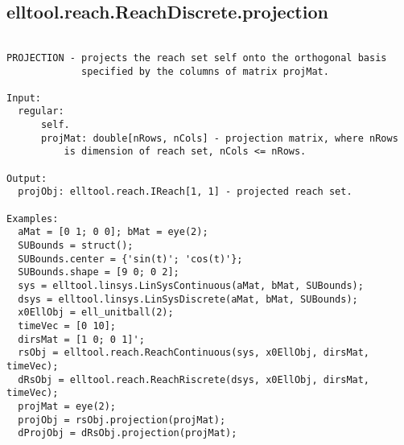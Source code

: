\subsection{\texorpdfstring{elltool.reach.ReachDiscrete.projection}{projection}}\label{method:elltool.reach.ReachDiscrete.projection}
\begin{verbatim}

PROJECTION - projects the reach set self onto the orthogonal basis
             specified by the columns of matrix projMat.

Input:
  regular:
      self.
      projMat: double[nRows, nCols] - projection matrix, where nRows
          is dimension of reach set, nCols <= nRows.

Output:
  projObj: elltool.reach.IReach[1, 1] - projected reach set.

Examples:
  aMat = [0 1; 0 0]; bMat = eye(2);
  SUBounds = struct();
  SUBounds.center = {'sin(t)'; 'cos(t)'};
  SUBounds.shape = [9 0; 0 2];
  sys = elltool.linsys.LinSysContinuous(aMat, bMat, SUBounds);
  dsys = elltool.linsys.LinSysDiscrete(aMat, bMat, SUBounds);
  x0EllObj = ell_unitball(2);
  timeVec = [0 10];
  dirsMat = [1 0; 0 1]';
  rsObj = elltool.reach.ReachContinuous(sys, x0EllObj, dirsMat, timeVec);
  dRsObj = elltool.reach.ReachRiscrete(dsys, x0EllObj, dirsMat, timeVec);
  projMat = eye(2);
  projObj = rsObj.projection(projMat);
  dProjObj = dRsObj.projection(projMat);
\end{verbatim}
